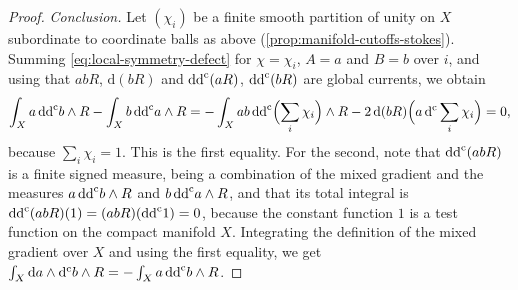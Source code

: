 \begin{proof}
\emph{Conclusion.} Let $(\chi_i)$ be a finite smooth partition of unity on $X$ subordinate to coordinate balls as above (\cref{prop:manifold-cutoffs-stokes}). Summing \eqref{eq:local-symmetry-defect} for $\chi=\chi_i$, $A=a$ and $B=b$ over $i$, and using that $abR$, $\mathrm d(bR)$ and $\mathrm{dd}^{\mathrm{c}}(aR)$, $\mathrm{dd}^{\mathrm{c}}(bR)$ are global currents, we obtain
\[
 \int_Xa\,\mathrm{dd}^{\mathrm{c}} b\wedge R-\int_Xb\,\mathrm{dd}^{\mathrm{c}} a\wedge R=-\int_Xab\,\mathrm{dd}^{\mathrm{c}}\Bigl(\sum_i\chi_i\Bigr)\wedge R-2\,\mathrm d(bR)\Bigl(a\,\mathrm d^{\mathrm c}\sum_i\chi_i\Bigr)=0,
\]
because $\sum_i\chi_i=1$. This is the first equality. For the second, note that $\mathrm{dd}^{\mathrm{c}}(abR)$ is a finite signed measure, being a combination of the mixed gradient and the measures $a\,\mathrm{dd}^{\mathrm{c}} b\wedge R$ and $b\,\mathrm{dd}^{\mathrm{c}} a\wedge R$, and that its total integral is $\mathrm{dd}^{\mathrm{c}}(abR)(1)=(abR)(\mathrm{dd}^{\mathrm{c}}1)=0$, because the constant function $1$ is a test function on the compact manifold $X$. Integrating the definition of the mixed gradient over $X$ and using the first equality, we get $\int_X\mathrm da\wedge\mathrm d^{\mathrm c}b\wedge R=-\int_Xa\,\mathrm{dd}^{\mathrm{c}} b\wedge R$.
\end{proof}


